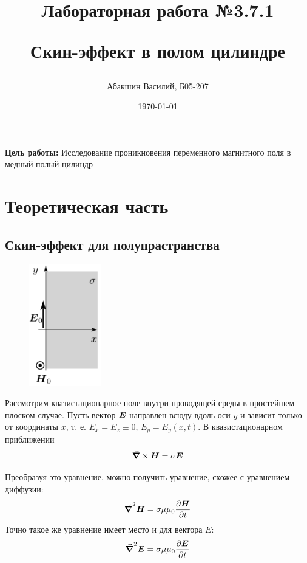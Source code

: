 \documentclass[a4paper, 12pt]{article}
\title{\begin{center}Лабораторная работа №3.7.1\end{center}
	Скин-эффект в полом цилиндре}
\author{Абакшин Василий, Б05-207}
\date{\today}
\begin{document}
	\maketitle
	\textbf{Цель работы:} Исследование проникновения переменного магнитного поля в медный полый цилиндр
	
	\section*{Теоретическая часть}
	\subsection*{Скин-эффект для полупрастранства}
	\vspace{1cm}
	\begin{figure}
		\begin{center}
			\includegraphics[width=0.28\textwidth]{poluprostranstvo}
		\end{center}
	\end{figure}
	
	Рассмотрим квазистационарное поле внутри проводящей среды в простейшем плоском случае.
	Пусть вектор $\vb*{E}$ направлен всюду вдоль оси $y$ и зависит только от координаты $x$, т. е. ${E_x} = {E_z} \equiv 0$, $E_y=E_y(x,t)$.
	В квазистационарном приближении 
	\begin{equation*}
		\grad \times \vb*{H} = \sigma \vb*{E}
	\end{equation*}
	
	Преобразуя это уравнение, можно получить уравнение, схожее с уравнением диффузии:
	\begin{equation}
		\grad^2\vb*{H}=\sigma\mu\mu_0 \frac{\partial \vb*{H}}{\partial t}\label{eq:laplacian_H}
	\end{equation}
	Точно такое же уравнение имеет место и для вектора $E:$
	\begin{equation}
		\grad^2\vb*{E}=\sigma\mu\mu_0 \frac{\partial \vb*{E}}{\partial t}\label{eq:diffusion}
	\end{equation}
	
\end{document}
